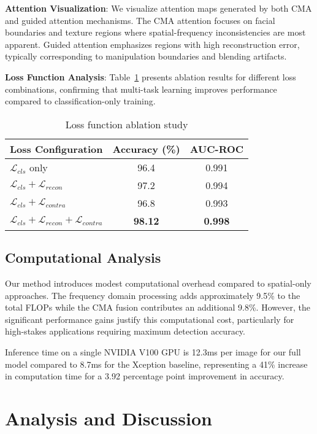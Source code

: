\documentclass[letterpaper]{article} %
\begin{document}
\textbf{Attention Visualization}: We visualize attention maps generated by both CMA and guided attention mechanisms. The CMA attention focuses on facial boundaries and texture regions where spatial-frequency inconsistencies are most apparent. Guided attention emphasizes regions with high reconstruction error, typically corresponding to manipulation boundaries and blending artifacts.

\textbf{Loss Function Analysis}: Table~\ref{tab:loss_analysis} presents ablation results for different loss combinations, confirming that multi-task learning improves performance compared to classification-only training.

\begin{table}[h]
\centering
\caption{Loss function ablation study}
\label{tab:loss_analysis}
\begin{tabular}{lcc}
\toprule
Loss Configuration & Accuracy (\%) & AUC-ROC \\
\midrule
$\mathcal{L}_{cls}$ only & 96.4 & 0.991 \\
$\mathcal{L}_{cls} + \mathcal{L}_{recon}$ & 97.2 & 0.994 \\
$\mathcal{L}_{cls} + \mathcal{L}_{contra}$ & 96.8 & 0.993 \\
$\mathcal{L}_{cls} + \mathcal{L}_{recon} + \mathcal{L}_{contra}$ & \textbf{98.12} & \textbf{0.998} \\
\bottomrule
\end{tabular}
\end{table}

\subsection{Computational Analysis}

Our method introduces modest computational overhead compared to spatial-only approaches. The frequency domain processing adds approximately 9.5\% to the total FLOPs while the CMA fusion contributes an additional 9.8\%. However, the significant performance gains justify this computational cost, particularly for high-stakes applications requiring maximum detection accuracy.

Inference time on a single NVIDIA V100 GPU is 12.3ms per image for our full model compared to 8.7ms for the Xception baseline, representing a 41\% increase in computation time for a 3.92 percentage point improvement in accuracy.

\section{Analysis and Discussion}
\end{document}
